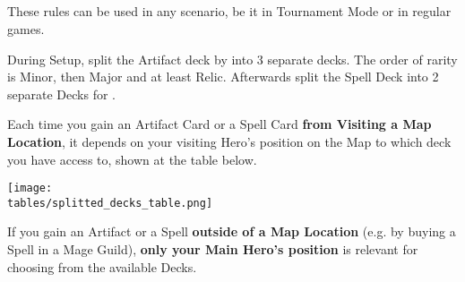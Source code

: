 \begin{multicols*}{2}
\subsection*{}

These rules can be used in any scenario, be it in Tournament Mode or in regular games.

During Setup, split the Artifact deck by  into 3 separate decks.
The order of rarity is Minor, then Major and at least Relic.
Afterwards split the Spell Deck into 2 separate Decks for .

Each time you gain an Artifact Card or a Spell Card \textbf{from Visiting a Map Location}, it depends on your visiting Hero's position on the Map to which deck you have access to, shown at the table below.

\texttt{[image: \\tables/splitted\_decks\_table.png]}

If you gain an Artifact or a Spell \textbf{outside of a Map Location} (e.g. by buying a Spell in a Mage Guild), \textbf{only your Main Hero's position} is relevant for choosing from the available Decks.

\end{multicols*}
